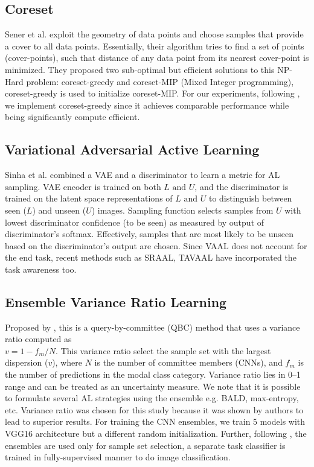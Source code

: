 \documentclass[10pt,twocolumn,letterpaper]{article}
\begin{document}
\subsection{Coreset}
Sener et al.\cite{coreset_sener2018active} exploit the geometry of data points and choose samples that provide a cover to all data points. Essentially, their algorithm tries to find a set of points (cover-points), such that distance of any data point from its nearest cover-point is minimized. They proposed two sub-optimal but efficient solutions to this NP-Hard problem: coreset-greedy and coreset-MIP (Mixed Integer programming), coreset-greedy is used to initialize coreset-MIP. For our experiments, following \cite{yoo2019learning_loss_for_AL}, we implement coreset-greedy since it achieves comparable performance while being significantly compute efficient. 








\subsection{Variational Adversarial Active Learning}
Sinha et al.\cite{VAAL_sinha2019variational} combined a VAE \cite{VAE_kingma} and a discriminator \cite{Goodfellow:2014:GAN:2969033.2969125} to learn a metric for AL sampling. VAE encoder is trained on both $L \text{ and } U$, and the discriminator is trained on the latent space representations of $L \text{ and } U$ to distinguish between seen ($L$) and unseen ($U$) images. Sampling function selects samples from $U$ with lowest discriminator confidence (to be seen) as measured by output of discriminator's softmax. Effectively, samples that are most likely to be unseen based on the discriminator's output are chosen. Since VAAL does not account for the end task, recent methods such as SRAAL\cite{SRAAL_zhang2020state}, TAVAAL\cite{tavaal_kim2021task} have incorporated the task awareness too.




\subsection{Ensemble Variance Ratio Learning}
Proposed by \cite{Ensembles_Beluch2018ThePO}, this is a query-by-committee (QBC) method that uses a variance ratio computed as \\
$v = 1-f_m/N$. This variance ratio select the sample set with the largest dispersion ($v$), where $N$ is the number of committee members (CNNs), and $f_m$ is the number of predictions in the modal class category. Variance ratio lies in 0--1 range and can be treated as an uncertainty measure. We note that it is possible to formulate several AL strategies using the ensemble e.g. BALD, max-entropy, etc. Variance ratio was chosen for this study because it was shown by authors to lead to superior results. For training the CNN ensembles, we train 5 models with VGG16 architecture but a different random initialization. Further, following \cite{Ensembles_Beluch2018ThePO}, the ensembles are used only for sample set selection, a separate task classifier is trained in fully-supervised manner to do image classification.
\end{document}
